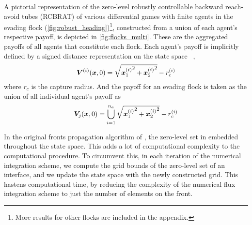 %
A pictorial representation of the zero-level robustly controllable backward reach-avoid tubes (RCBRAT) of various differential  games with finite agents in the evading flock (\cf\autoref{fig:robust_heading})\footnote{More results for other flocks are included in the appendix.}, constructed from a union of each agent's respective payoff,  is depicted in \autoref{fig:flocks_multi}. These are  the aggregated payoffs of all  agents that constitute each  flock. Each agent's payoff is implicitly defined by a signed distance representation on the state space~\cite{LevelSetsBook} \ie, %
%
\begin{align}
	\bm{V}^{(i)}(\bm{x}, 0) = \sqrt{{\bm{x}_1^{(i)}}^2 + {\bm{x}_2^{(i)}}^2} - r_c^{(i)}
\end{align}
%
where $r_c$ is the capture radius. And the payoff for an evading flock is taken as the union of all individual agent's payoff as
%
\begin{align}
	\bm{V}_j(\bm{x}, 0) = \bigcup_{i=1}^{n_a} \sqrt{{\bm{x}_1^{(i)}}^2 + {\bm{x}_2^{(i)}}^2} - r_c^{(i)} 
\end{align}

In the original fronts propagation algorithm of \cite{OsherFronts}, the zero-level set in embedded throughout the state space. This adds a lot of computational complexity to the computational procedure. To circumvent this, in each iteration of the numerical integration scheme, we compute the grid bounds of the zero-level set of an interface, and we update the state space with the newly constructed grid. This hastens computational time, by reducing the complexity of the numerical flux integration scheme to just the number of elements on the front. 

